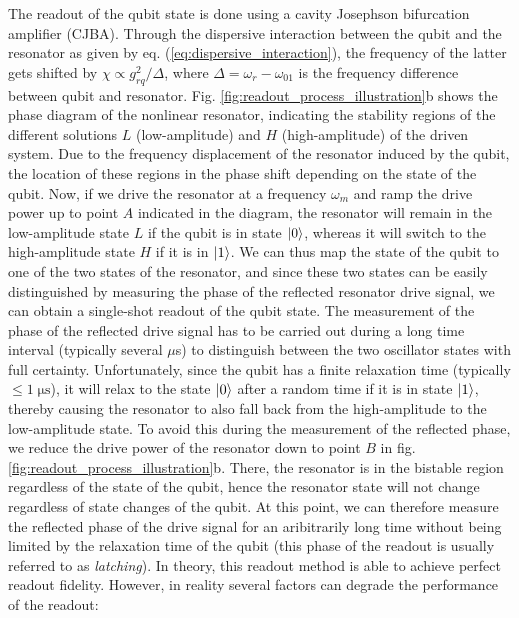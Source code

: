 The readout of the qubit state is done using a cavity Josephson bifurcation amplifier (CJBA). Through the dispersive interaction between the qubit and the resonator as given by eq. (\ref{eq:dispersive_interaction}), the frequency of the latter gets shifted by $\chi\propto g_{rq}^2/\Delta$, where $\Delta=\omega_r-\omega_{01}$ is the frequency difference between qubit and resonator. Fig. \ref{fig:readout_process_illustration}b shows the phase diagram of the nonlinear resonator, indicating the stability regions of the different solutions $L$ (low-amplitude) and $H$ (high-amplitude) of the driven system. Due to the frequency displacement of the resonator induced by the qubit, the location of these regions in the phase shift depending on the state of the qubit. Now, if we drive the resonator at a frequency $\omega_m$ and ramp the drive power up to point $A$ indicated in the diagram, the resonator will remain in the low-amplitude state $L$ if the qubit is in state $\left| 0 \right>$, whereas it will switch to the high-amplitude state $H$ if it is in $\left| 1 \right>$. We can thus map the state of the qubit to one of the two states of the resonator, and since these two states can be easily distinguished by measuring the phase of the reflected resonator drive signal, we can obtain a single-shot readout of the qubit state. The measurement of the phase of the reflected drive signal has to be carried out during a long time interval (typically several $\mu$s) to distinguish between the two oscillator states with full certainty. Unfortunately, since the qubit has a finite relaxation time (typically $\le 1\;\mathrm{\mu s}$), it will relax to the state $\left| 0 \right>$ after a random time if it is in state $\left| 1 \right>$, thereby causing the resonator to also fall back from the high-amplitude to the low-amplitude state. To avoid this during the measurement of the reflected phase, we reduce the drive power of the resonator down to point $B$ in fig. \ref{fig:readout_process_illustration}b. There, the resonator is in the bistable region regardless of the state of the qubit, hence the resonator state will not change regardless of state changes of the qubit. At this point, we can therefore measure the reflected phase of the drive signal for an aribitrarily long time without being limited by the relaxation time of the qubit (this phase of the readout is usually referred to as {\it latching}). In theory, this readout method is able to achieve perfect readout fidelity. However, in reality several factors can degrade the performance of the readout:

